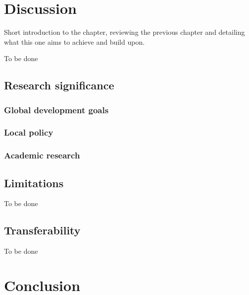 \documentclass[
  12pt,
  oneside]{book}
\begin{document}
\hypertarget{discussion}{%
\chapter{Discussion}\label{discussion}}

Short introduction to the chapter, reviewing the previous chapter and detailing what this one aims to achieve and build upon.

To be done

\hypertarget{research-significance}{%
\section{Research significance}\label{research-significance}}

\hypertarget{global-development-goals}{%
\subsection{Global development goals}\label{global-development-goals}}

\hypertarget{local-policy}{%
\subsection{Local policy}\label{local-policy}}

\hypertarget{academic-research}{%
\subsection{Academic research}\label{academic-research}}

\hypertarget{limitations-1}{%
\section{Limitations}\label{limitations-1}}

To be done

\hypertarget{transferability}{%
\section{Transferability}\label{transferability}}

To be done

\hypertarget{conclusion}{%
\chapter{Conclusion}\label{conclusion}}
\end{document}
